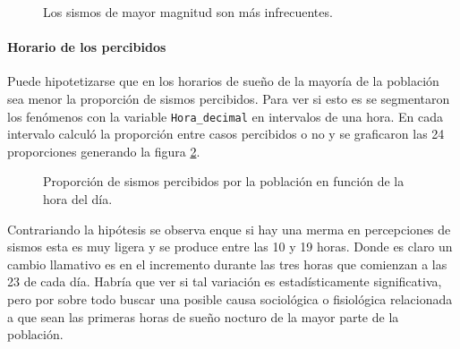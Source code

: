 \documentclass[a4paper]{report}
\begin{document}

\begin{figure}[!h]
\centering

\caption{Los sismos de mayor magnitud son más infrecuentes.}
\label{fig:acumulado_anual_magnitud}
\end{figure}


\paragraph{Horario de los percibidos}
Puede hipotetizarse que en los horarios de sueño de la mayoría de la población sea menor la proporción de sismos percibidos.
Para ver si esto es se segmentaron los fenómenos con la variable \verb'Hora_decimal' en intervalos de una hora.
En cada intervalo calculó la proporción entre casos percibidos o no y se graficaron las 24 proporciones generando la figura \ref{fig:histograma_percibidos_por_hora}. 
\begin{figure}[!h]
\centering

\caption{Proporción de sismos percibidos por la población en función de la hora del día.}
\label{fig:histograma_percibidos_por_hora}
\end{figure}

Contrariando la hipótesis se observa enque si hay una merma en percepciones de sismos esta es muy ligera y se produce entre las 10 y 19 horas.
Donde es claro un cambio llamativo es en el incremento durante las tres horas que comienzan a las 23 de cada día.
Habría que ver si tal variación es estadísticamente significativa, pero por sobre todo buscar una posible causa sociológica o fisiológica relacionada a que sean las primeras horas de sueño nocturo de la mayor parte de la población.
\end{document}
